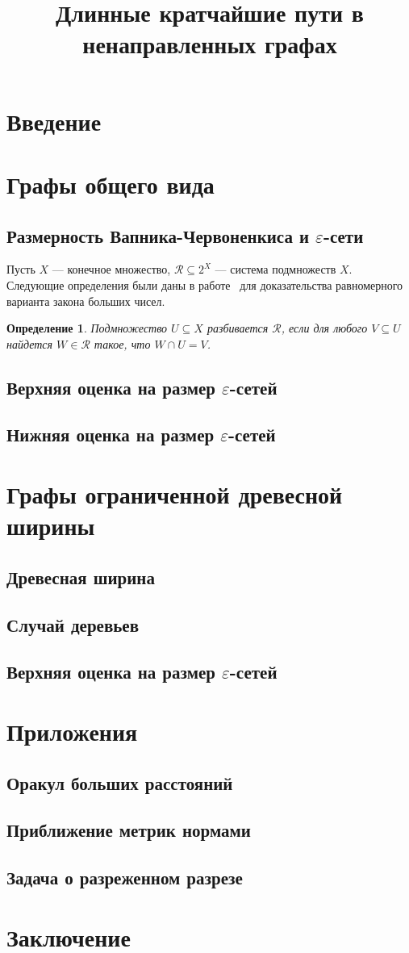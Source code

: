 \documentclass{article}
\title{Длинные кратчайшие пути в ненаправленных графах}
\newcommand{\eps}{\varepsilon}
\newcommand{\Rc}{\mathcal{R}}
\newtheorem{definition}{Определение}
\begin{document}
    \maketitle
    \section{Введение}
    \section{Графы общего вида}
    \subsection{Размерность Вапника-Червоненкиса и $\eps$-сети}

    Пусть $X$ --- конечное множество, $\Rc \subseteq 2^X$ --- система подмножеств $X$.
    Следующие определения были даны в работе~\cite{VC71} для доказательства равномерного варианта закона больших чисел.

    \begin{definition}
        Подмножество $U \subseteq X$ \emph{разбивается} $\Rc$, если для любого $V \subseteq U$ найдется $W \in \Rc$ такое,
        что $W \cap U = V$.
    \end{definition}

    \subsection{Верхняя оценка на размер $\eps$-сетей}
    \subsection{Нижняя оценка на размер $\eps$-сетей}
    \cite{A10}
    \section{Графы ограниченной древесной ширины}
    \subsection{Древесная ширина}
    \subsection{Случай деревьев}
    \subsection{Верхняя оценка на размер $\eps$-сетей}
    \section{Приложения}
    \subsection{Оракул больших расстояний}
    \subsection{Приближение метрик нормами}
    \subsection{Задача о разреженном разрезе}
    \section{Заключение}
    
    
\end{document}

